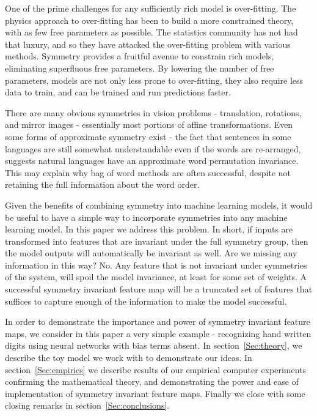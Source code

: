 \documentclass[twocolumn, prl]{revtex4-1}
\begin{document}

One of the prime challenges for any sufficiently rich model is over-fitting. The physics approach to over-fitting has been to build a more constrained theory, with as few free parameters as possible. The statistics community has not had that luxury, and so they have attacked the over-fitting problem with various methods. Symmetry provides a fruitful avenue to constrain rich models, eliminating superfluous free parameters. By lowering the number of free parameters, models are not only less prone to over-fitting, they also require less data to train, and can be trained and run predictions faster.


There are many obvious symmetries in vision problems - translation, rotations, and mirror images - essentially most portions of affine transformations\cite{gens2014deep, dieleman2016exploiting, cohen2016group, henriques2016warped}. Even some forms of approximate symmetry exist\cite{kiddonsymmetry} - the fact that sentences in some languages are still somewhat understandable even if the words are re-arranged, suggests natural languages have an approximate word permutation invariance. This may explain why bag of word methods are often successful, despite not retaining the full information about the word order. 

Given the benefits of combining symmetry into machine learning models, it would be useful to have a simple way to incorporate symmetries into any machine learning model. In this paper we address this problem. In short, if inputs are transformed into features that are invariant under the full symmetry group, then the model outputs will automatically be invariant as well. Are we missing any information in this way? No. Any feature that is not invariant under symmetries of the system, will spoil the model invariance, at least for some set of weights. A successful symmetry invariant feature map will be a truncated set of features that suffices to capture enough of the information to make the model successful.

In order to demonstrate the importance and power of symmetry invariant feature maps, we consider in this paper a very simple example - recognizing hand written digits using neural networks with bias terms absent. In section~\ref{Sec:theory}, we describe the toy model we work with to demonstrate our ideas. In section~\ref{Sec:empirics} we describe results of our empirical computer experiments confirming the mathematical theory, and demonstrating the power and ease of implementation of symmetry invariant feature maps. Finally we close with some closing remarks in section~\ref{Sec:conclusions}.
\end{document}
